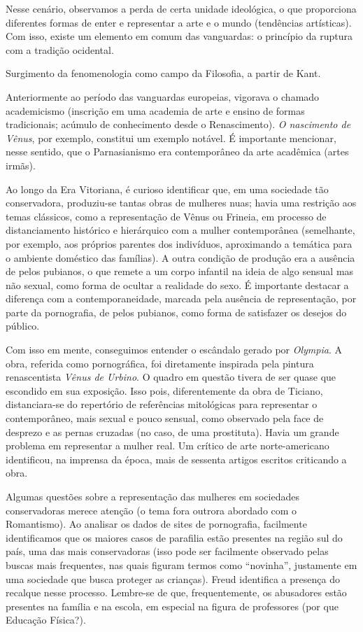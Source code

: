 Nesse cenário, observamos a perda de certa unidade ideológica, o que proporciona diferentes formas de enter e representar a arte e o mundo (tendências artísticas). Com isso, existe um elemento em comum das vanguardas: o princípio da ruptura com a tradição ocidental.

Surgimento da fenomenologia como campo da Filosofia, a partir de Kant.

Anteriormente ao período das vanguardas europeias, vigorava o chamado academicismo (inscrição em uma academia de arte e ensino de formas tradicionais; acúmulo de conhecimento desde o Renascimento). \textit{O nascimento de Vênus}, por exemplo, constitui um exemplo notável. É importante mencionar, nesse sentido, que o Parnasianismo era contemporâneo da arte acadêmica (artes irmãs).

Ao longo da Era Vitoriana, é curioso identificar que, em uma sociedade tão conservadora, produziu-se tantas obras de mulheres nuas; havia uma restrição aos temas clássicos, como a representação de Vênus ou Frineia, em processo de distanciamento histórico e hierárquico com a mulher contemporânea (semelhante, por exemplo, aos próprios parentes dos indivíduos, aproximando a temática para o ambiente doméstico das famílias). A outra condição de produção era a ausência de pelos pubianos, o que remete a um corpo infantil na ideia de algo sensual mas não sexual, como forma de ocultar a realidade do sexo. É importante destacar a diferença com a contemporaneidade, marcada pela ausência de representação, por parte da pornografia, de pelos pubianos, como forma de satisfazer os desejos do público.

Com isso em mente, conseguimos entender o escândalo gerado por \textit{Olympia}. A obra, referida como pornográfica, foi diretamente inspirada pela pintura renascentista \textit{Vênus de Urbino}. O quadro em questão tivera de ser quase que escondido em sua exposição. Isso pois, diferentemente da obra de Ticiano, distanciara-se do repertório de referências mitológicas para representar o contemporâneo, mais sexual e pouco sensual, como observado pela face de desprezo e as pernas cruzadas (no caso, de uma prostituta). Havia um grande problema em representar a mulher real. Um crítico de arte norte-americano identificou, na imprensa da época, mais de sessenta artigos escritos criticando a obra.

Algumas questões sobre a representação das mulheres em sociedades conservadoras merece atenção (o tema fora outrora abordado com o Romantismo). Ao analisar os dados de sites de pornografia, facilmente identificamos que os maiores casos de parafilia estão presentes na região sul do país, uma das mais conservadoras (isso pode ser facilmente observado pelas buscas mais frequentes, nas quais figuram termos como ``novinha'', justamente em uma sociedade que busca proteger as crianças). Freud identifica a presença do recalque nesse processo. Lembre-se de que, frequentemente, os abusadores estão presentes na família e na escola, em especial na figura de professores (por que Educação Física?).

